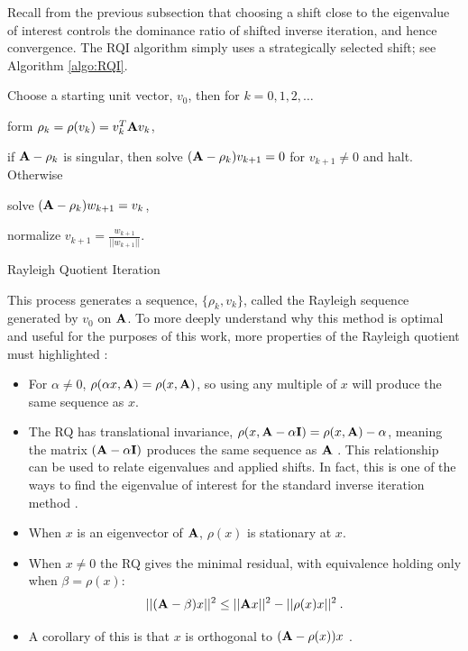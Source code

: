 Recall from the previous subsection that choosing a shift close to the eigenvalue of interest controls the dominance ratio of shifted inverse iteration, and hence convergence. The RQI algorithm simply uses a strategically selected shift; see Algorithm \ref{algo:RQI}.
\begin{algorithm}
  Choose a starting unit vector, $v_{0}$, then for $k = 0,1,2,\dots$
  \begin{list}{}{\hspace{2.5em}}
    \item form $\rho_{k} = \rho(v_{k}) = v_{k}^{T}\mathbf{A}v_{k}$,
    \item if $\mathbf{A} - \rho_{k}$ is singular, then solve $(\mathbf{A} - \rho_{k})v_{k+1} = 0$ for $v_{k+1} \ne 0$ and halt. Otherwise 
    \item solve $(\mathbf{A} - \rho_{k})w_{k+1} = v_{k}$,
    \item normalize $v_{k+1} = \frac{w_{k+1}}{||w_{k+1}||}$.
  \end{list}
  \caption{Rayleigh Quotient Iteration}
  \label{algo:RQI}
\end{algorithm}
%
This process generates a sequence, $\{\rho_{k}, v_{k}\}$, called the Rayleigh sequence generated by $v_{0}$ on $\mathbf{A}$. To more deeply understand why this method is optimal and useful for the purposes of this work, more properties of the Rayleigh quotient must highlighted \cite{Parlett1974}: 
%
\begin{itemize}
  \item For $\alpha \ne 0$, $\rho(\alpha x, \mathbf{A}) = \rho(x, \mathbf{A})$, so using any multiple of $x$ will produce the same sequence as $x$. 
  \item The RQ has translational invariance, $\rho(x, \mathbf{A} - \alpha \mathbf{I}) = \rho(x,\mathbf{A}) - \alpha$, meaning the matrix $(\mathbf{A} - \alpha \mathbf{I})$ produces the same sequence as $\mathbf{A}$ \cite{Parlett1974}. This relationship can be used to relate eigenvalues and applied shifts. In fact, this is one of the ways to find the eigenvalue of interest for the standard inverse iteration method \cite{Sorensen1996}. 
\item When $x$ is an eigenvector of $\mathbf{A}$, $\rho(x)$ is stationary at $x$.  
\item When $x \ne 0$ the RQ gives the minimal residual, with equivalence holding only when $\beta = \rho(x)$:
%
\begin{equation}
  ||(\mathbf{A} - \beta)x||^{2} \le ||\mathbf{A}x||^{2} - ||\rho(x)x||^{2} \:.
\end{equation}
%
\item A corollary of this is that $x$ is orthogonal to $(\mathbf{A} - \rho(x))x$ \cite{Parlett1974}. 
\end{itemize}

